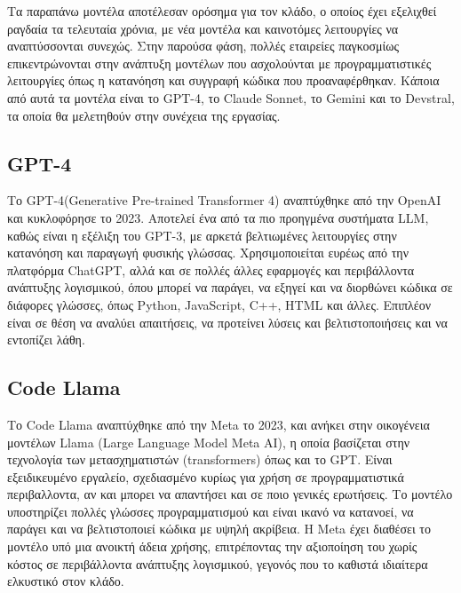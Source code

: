 Τα παραπάνω μοντέλα αποτέλεσαν ορόσημα για τον κλάδο, ο οποίος έχει εξελιχθεί ραγδαία τα τελευταία χρόνια, με νέα μοντέλα και καινοτόμες λειτουργίες να αναπτύσσονται συνεχώς. Στην παρούσα φάση, πολλές εταιρείες παγκοσμίως επικεντρώνονται στην ανάπτυξη μοντέλων που ασχολούνται με προγραμματιστικές λειτουργίες όπως η κατανόηση και συγγραφή κώδικα που προαναφέρθηκαν. Κάποια από αυτά τα μοντέλα είναι το GPT-4, το Claude Sonnet, το Gemini και το Devstral, τα οποία θα μελετηθούν στην συνέχεια της εργασίας.

\subsection{GPT-4}
Το GPT-4(Generative Pre-trained Transformer 4)  αναπτύχθηκε από την OpenAI και κυκλοφόρησε το 2023. Αποτελεί ένα από τα πιο προηγμένα συστήματα LLM, καθώς είναι η εξέλιξη του GPT-3, με αρκετά βελτιωμένες λειτουργίες στην κατανόηση και παραγωγή φυσικής γλώσσας. Χρησιμοποιείται ευρέως από την πλατφόρμα ChatGPT, αλλά και σε πολλές άλλες εφαρμογές και περιβάλλοντα ανάπτυξης λογισμικού, όπου μπορεί να παράγει, να εξηγεί και να διορθώνει κώδικα σε διάφορες γλώσσες, όπως Python, JavaScript, C++, HTML και άλλες. Επιπλέον είναι σε θέση να αναλύει απαιτήσεις, να προτείνει λύσεις και βελτιστοποιήσεις και να εντοπίζει λάθη. 

\subsection{Code Llama}
Το  Code Llama αναπτύχθηκε από την Meta το 2023, και ανήκει στην οικογένεια μοντέλων Llama (Large Language Model Meta AI), η οποία βασίζεται στην τεχνολογία των μετασχηματιστών (transformers) όπως και το GPT. Είναι εξειδικευμένο εργαλείο, σχεδιασμένο κυρίως για χρήση σε προγραμματιστικά περιβαλλοντα, αν και μπορει να απαντήσει και σε ποιο γενικές ερωτήσεις. Το μοντέλο υποστηρίζει πολλές γλώσσες προγραμματισμού και είναι ικανό να κατανοεί, να παράγει και να βελτιστοποιεί κώδικα με υψηλή ακρίβεια. Η Meta έχει διαθέσει το μοντέλο υπό μια ανοικτή άδεια χρήσης, επιτρέποντας την αξιοποίηση του χωρίς κόστος σε περιβάλλοντα ανάπτυξης λογισμικού, γεγονός που το καθιστά ιδιαίτερα ελκυστικό στον κλάδο.

